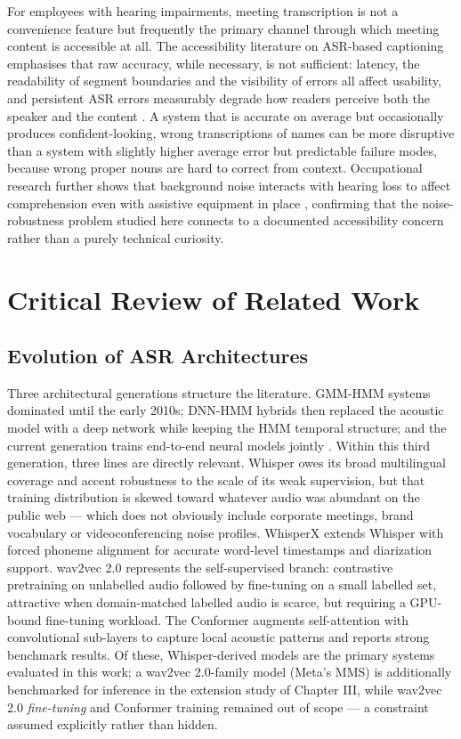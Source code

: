 \documentclass[12pt]{report}
\begin{document}
For employees with hearing impairments, meeting transcription is not a convenience feature but frequently the primary channel through which meeting content is accessible at all. The accessibility literature on ASR-based captioning emphasises that raw accuracy, while necessary, is not sufficient: latency, the readability of segment boundaries and the visibility of errors all affect usability, and persistent ASR errors measurably degrade how readers perceive both the speaker and the content \cite{kadoma2026lost}. A system that is accurate on average but occasionally produces confident-looking, wrong transcriptions of names can be more disruptive than a system with slightly higher average error but predictable failure modes, because wrong proper nouns are hard to correct from context. Occupational research further shows that background noise interacts with hearing loss to affect comprehension even with assistive equipment in place \cite{giguere2010modelling}, confirming that the noise-robustness problem studied here connects to a documented accessibility concern rather than a purely technical curiosity.

\section{Critical Review of Related Work}

\subsection{Evolution of ASR Architectures}

Three architectural generations structure the literature. GMM-HMM systems dominated until the early 2010s; DNN-HMM hybrids then replaced the acoustic model with a deep network while keeping the HMM temporal structure; and the current generation trains end-to-end neural models jointly \cite{li2014overview,vaswani2017attention}. Within this third generation, three lines are directly relevant. Whisper \cite{radford2023robust} owes its broad multilingual coverage and accent robustness to the scale of its weak supervision, but that training distribution is skewed toward whatever audio was abundant on the public web --- which does not obviously include corporate meetings, brand vocabulary or videoconferencing noise profiles. WhisperX \cite{bain2023whisperx} extends Whisper with forced phoneme alignment for accurate word-level timestamps and diarization support. wav2vec 2.0 \cite{baevski2020wav2vec} represents the self-supervised branch: contrastive pretraining on unlabelled audio followed by fine-tuning on a small labelled set, attractive when domain-matched labelled audio is scarce, but requiring a GPU-bound fine-tuning workload. The Conformer \cite{gulati2020conformer} augments self-attention with convolutional sub-layers to capture local acoustic patterns and reports strong benchmark results. Of these, Whisper-derived models are the primary systems evaluated in this work; a wav2vec 2.0-family model (Meta's MMS) is additionally benchmarked for inference in the extension study of Chapter III, while wav2vec 2.0 \emph{fine-tuning} and Conformer training remained out of scope --- a constraint assumed explicitly rather than hidden.
\end{document}
